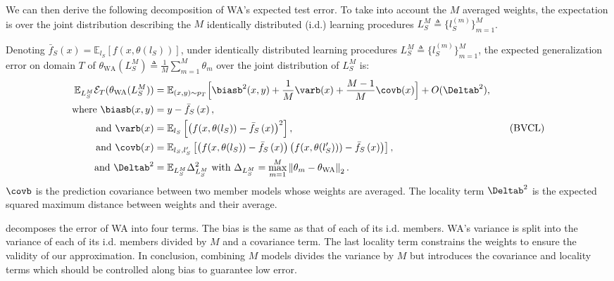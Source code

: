 We can then derive the following decomposition of WA's expected test error. To take into account the $M$ averaged weights, the expectation is over the joint distribution describing the $M$ identically distributed (i.d.) learning procedures $L_S^M\triangleq\{l_S^{(m)}\}_{m=1}^M$.
\begin{proposition}
    \label{prop:b_var_cov}
    Denoting $\bar{f}_S\left(x\right) = \mathbb{E}_{l_S} \left[f\left(x,\theta\left(l_S\right)\right)\right]$, under identically distributed learning procedures $L_S^M\triangleq\{l_S^{(m)}\}_{m=1}^M$, the expected generalization error on domain $T$ of $\theta_{\text{WA}}(L_S^M)\triangleq\frac{1}{M} \sum\nolimits_{m=1}^{M} \theta_m$ over the joint distribution of $L_S^M$ is:%
    \begin{equation}
        \begin{aligned}
             \mathbb{E}_{L_S^M}\mathcal{E}_T(\theta_{\text{WA}}(L_S^M)) &= \mathbb{E}_{(x,y)\sim p_T}\Big[\biasb^2(x, y)+\frac{1}{M} \varb(x)+\frac{M-1}{M} \covb(x)\Big] + O(\Deltab^2), \\
             \text{where~}\biasb(x,y)&=y-\bar{f}_S\left(x\right), \\
             \text{and~}\varb(x)&=\mathbb{E}_{l_S}\left[\left(f(x, \theta(l_S)) - \bar{f}_S\left(x\right)\right)^{2}\right], \\
             \text{and~}\covb(x)&= \mathbb{E}_{l_S,l_S'}\left[\left(f(x,\theta(l_S))-\bar{f}_S\left(x\right)\right)\left(f(x,\theta(l_S')))-\bar{f}_S\left(x\right)\right)\right], \\
             \text{and~}\Deltab^2&=\mathbb{E}_{L_S^M}\Delta_{L_S^M}^2 \text{~with~} \Delta_{L_S^M}=\max_{m=1}^{M}\left\|\theta_m-\theta_{\text{WA}}\right\|_2.%
        \end{aligned} \tag{BVCL}\label{eq:b_var_cov}%
    \end{equation}%
    $\covb$ is the prediction covariance between two member models whose weights are averaged.
    The locality term $\Deltab^2$ is the expected squared maximum distance between weights and their average.
\end{proposition}
 decomposes the \ood error of WA into four terms.
The bias is the same as that of each of its i.d. members.
WA's variance is split into the variance of each of its i.d. members divided by $M$ and a covariance term.
The last locality term constrains the weights to ensure the validity of our approximation.
In conclusion, combining $M$ models divides the variance by $M$ but introduces the covariance and locality terms which should be controlled along bias to guarantee low \ood error.